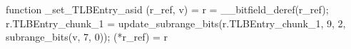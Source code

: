 function _set_TLBEntry_asid (r_ref, v) = {
    r = __bitfield_deref(r_ref);
    r.TLBEntry_chunk_1 = update_subrange_bits(r.TLBEntry_chunk_1, 9, 2, subrange_bits(v, 7, 0));
    (*r_ref) = r
}

